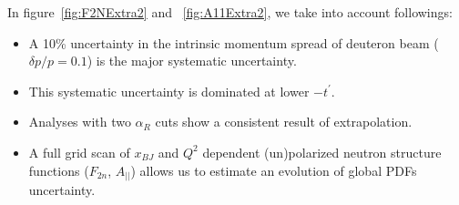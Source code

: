 \documentclass[12pt,letterpaper]{article}
\begin{document}


In figure~\ref{fig:F2NExtra2} and ~\ref{fig:A11Extra2}, we take into account followings:
\begin{itemize}
\item A 10\% uncertainty in the intrinsic momentum spread of deuteron beam ($\delta p/p = 0.1$) is the major systematic uncertainty.
\item This systematic uncertainty is dominated at lower $-t^{\prime}$.
\item Analyses with two $\alpha_R$ cuts show a consistent result of extrapolation. 
\item A full grid scan of $x_{BJ}$ and $Q^2$ dependent (un)polarized neutron structure functions ($F_{2n}$, $A_{||}$) allows us to estimate an evolution of global PDFs uncertainty.
\end{itemize}
\end{document}
